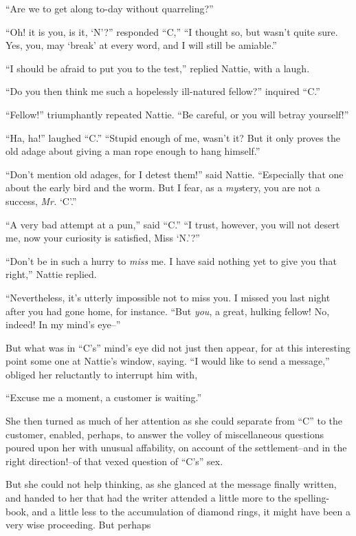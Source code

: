 ``Are we to get along to-day without quarreling?''

``Oh! it is you, is it, `N'?'' responded ``C,'' ``I thought so, but wasn't
quite sure. Yes, you, may `break' at every word, and I will still be
amiable.''

``I should be afraid to put you to the test,'' replied Nattie, with a
laugh.

``Do you then think me such a hopelessly ill-natured fellow?'' inquired
``C.''

``Fellow!'' triumphantly repeated Nattie. ``Be careful, or you will betray
yourself!''

``Ha, ha!'' laughed ``C.'' ``Stupid enough of me, wasn't it? But it only
proves the old adage about giving a man rope enough to hang himself.''

``Don't mention old adages, for I detest them!'' said Nattie. ``Especially
that one about the early bird and the worm. But I fear, as a \emph{mys}tery,
you are not a success, \emph{Mr.} `C'.''

``A very bad attempt at a pun,'' said ``C.'' ``I trust, however, you will not
desert me, now your curiosity is satisfied, Miss `N.'?''

``Don't be in such a hurry to \emph{miss} me. I have said nothing yet to give
you that right,'' Nattie replied.

``Nevertheless, it's utterly impossible not to miss you. I missed you
last night after you had gone home, for instance. ``But \emph{you}, a great,
hulking fellow! No, indeed! In my mind's eye--''

But what was in ``C's'' mind's eye did not just then appear, for at this
interesting point some one at Nattie's window, saying. ``I would like to
send a message,'' obliged her reluctantly to interrupt him with,

``Excuse me a moment, a customer is waiting.''

She then turned as much of her attention as she could separate from ``C''
to the customer, enabled, perhaps, to answer the volley of miscellaneous
questions poured upon her with unusual affability, on account of the
settlement--and in the right direction!--of that vexed question of ``C's''
sex.

But she could not help thinking, as she glanced at the message finally
written, and handed to her that had the writer attended a little more to
the spelling-book, and a little less to the accumulation of diamond
rings, it might have been a very wise proceeding. But perhaps

